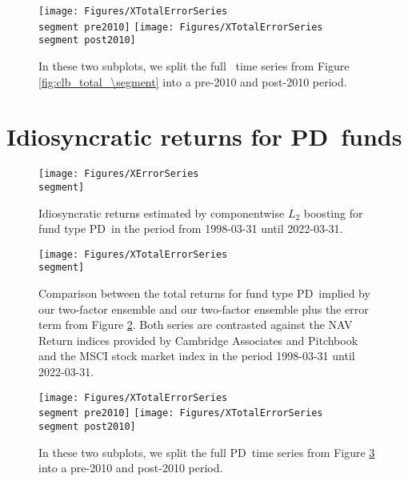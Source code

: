 \begin{figure}[H]
	\centering
	\texttt{[image: Figures/XTotalErrorSeries\\segment pre2010]}
	\texttt{[image: Figures/XTotalErrorSeries\\segment post2010]}
	\caption{
		In these two subplots, we split the full \segment \ time series from Figure \ref{fig:clb_total_\segment} into a pre-2010 and post-2010 period.
	}
	\label{fig:clb_pre_post_2010_\segment}
\end{figure}


\renewcommand{\segment}{PD}

\section{Idiosyncratic returns for \segment \ funds}
\label{sec:errors_\segment}

\begin{figure}[H]
	\centering
	\texttt{[image: Figures/XErrorSeries\\segment]}
	\caption{Idiosyncratic returns estimated by componentwise $L_2$ boosting for fund type \segment \ in the period from 1998-03-31 until 2022-03-31.}
	\label{fig:clb_idio_\segment}
\end{figure}

\begin{figure}[H]
	\centering
	\texttt{[image: Figures/XTotalErrorSeries\\segment]}
	\caption{
		Comparison between the total returns for fund type \segment \ implied by our two-factor ensemble and our two-factor ensemble plus the error term from Figure \ref{fig:clb_idio_\segment}.
		Both series are contrasted against the NAV Return indices provided by Cambridge Associates and Pitchbook and the MSCI stock market index in the period 1998-03-31 until 2022-03-31.
	}
	\label{fig:clb_total_\segment}
\end{figure}

\begin{figure}[H]
	\centering
	\texttt{[image: Figures/XTotalErrorSeries\\segment pre2010]}
	\texttt{[image: Figures/XTotalErrorSeries\\segment post2010]}
	\caption{
		In these two subplots, we split the full \segment \ time series from Figure \ref{fig:clb_total_\segment} into a pre-2010 and post-2010 period.
	}
	\label{fig:clb_pre_post_2010_\segment}
\end{figure}

